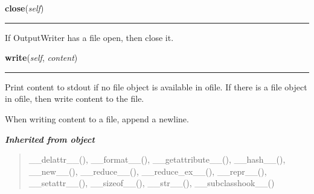     \vspace{0.5ex}

\hspace{.8\funcindent}\begin{boxedminipage}{\funcwidth}

    \raggedright \textbf{close}(\textit{self})

    \vspace{-1.5ex}

    \rule{\textwidth}{0.5\fboxrule}
\setlength{\parskip}{2ex}
    If OutputWriter has a file open, then close it.

\setlength{\parskip}{1ex}
    \end{boxedminipage}

    \label{Tiling:OutputWriter:write}

    \vspace{0.5ex}

\hspace{.8\funcindent}\begin{boxedminipage}{\funcwidth}

    \raggedright \textbf{write}(\textit{self}, \textit{content})

    \vspace{-1.5ex}

    \rule{\textwidth}{0.5\fboxrule}
\setlength{\parskip}{2ex}
    Print content to stdout if no file object is available in ofile. If 
    there is a file object in ofile, then write content to the file.

    When writing content to a file, append a newline.

\setlength{\parskip}{1ex}
    \end{boxedminipage}


\large{\textbf{\textit{Inherited from object}}}

\begin{quote}
\_\_delattr\_\_(), \_\_format\_\_(), \_\_getattribute\_\_(), \_\_hash\_\_(), \_\_new\_\_(), \_\_reduce\_\_(), \_\_reduce\_ex\_\_(), \_\_repr\_\_(), \_\_setattr\_\_(), \_\_sizeof\_\_(), \_\_str\_\_(), \_\_subclasshook\_\_()
\end{quote}



